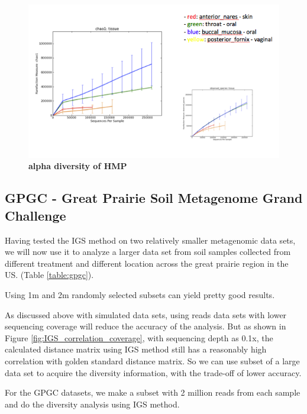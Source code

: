 \documentclass{article}
\begin{document}
\begin{figure}[!ht]
 \centerline{\includegraphics[width=7in]{./figures/HMP_alpha.png}}
\caption{\bf alpha diversity of HMP}
\label{fig:HMP_alpha}
\end{figure}





\subsection{GPGC - Great Prairie Soil Metagenome Grand Challenge}

Having tested the IGS method on two relatively smaller metagenomic data sets, we will now use it to analyze 
a larger data set from soil samples collected from different treatment and different location across the great prairie region in the US. 
(Table \ref{table:gpgc}). 




Using 1m and 2m randomly selected subsets can yield pretty good results.

As discussed above with simulated data sets, using reads data sets with lower sequencing coverage will reduce
the accuracy of the analysis. But as shown in Figure \ref{fig:IGS_correlation_coverage}, with sequencing depth
as 0.1x, the calculated distance matrix using IGS method still has a reasonably high correlation with golden standard
distance matrix. So we can use subset of a large data set to acquire the diversity information, with the trade-off of
lower accuracy. 

For the GPGC datasets, we make a subset with 2 million reads from each sample and do the diversity analysis
using IGS method. 
\end{document}
